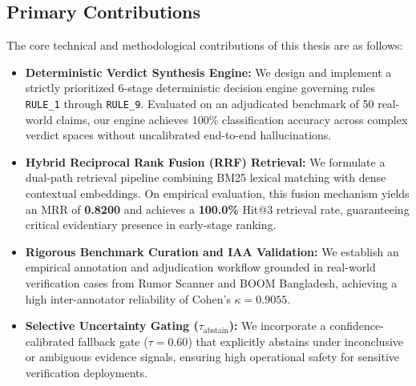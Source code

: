 \subsection{Primary Contributions}
The core technical and methodological contributions of this thesis are as follows:
\begin{itemize}
    \item \textbf{Deterministic Verdict Synthesis Engine:} We design and implement a strictly prioritized 6-stage deterministic decision engine governing rules \texttt{RULE\_1} through \texttt{RULE\_9}. Evaluated on an adjudicated benchmark of 50 real-world claims, our engine achieves 100\% classification accuracy across complex verdict spaces without uncalibrated end-to-end hallucinations.
    \item \textbf{Hybrid Reciprocal Rank Fusion (RRF) Retrieval:} We formulate a dual-path retrieval pipeline combining BM25 lexical matching with dense contextual embeddings. On empirical evaluation, this fusion mechanism yields an MRR of \textbf{0.8200} and achieves a \textbf{100.0\%} Hit@3 retrieval rate, guaranteeing critical evidentiary presence in early-stage ranking.
    \item \textbf{Rigorous Benchmark Curation and IAA Validation:} We establish an empirical annotation and adjudication workflow grounded in real-world verification cases from Rumor Scanner and BOOM Bangladesh, achieving a high inter-annotator reliability of Cohen's $\kappa = \mathbf{0.9055}$.
    \item \textbf{Selective Uncertainty Gating ($\tau_{\text{abstain}}$):} We incorporate a confidence-calibrated fallback gate ($\tau = 0.60$) that explicitly abstains under inconclusive or ambiguous evidence signals, ensuring high operational safety for sensitive verification deployments.
\end{itemize}
